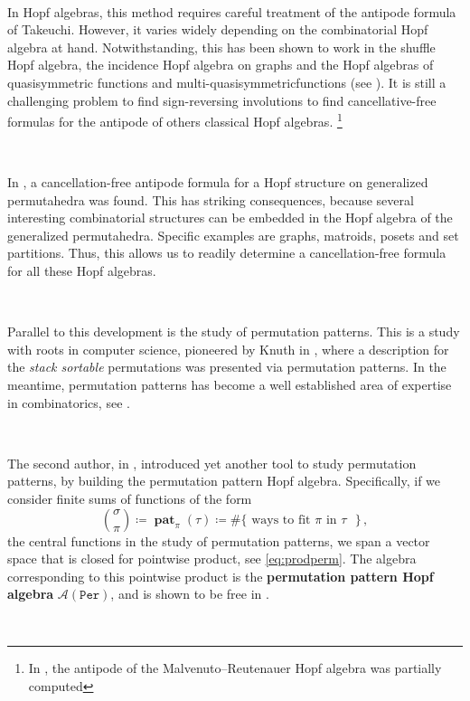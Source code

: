 \documentclass[12pt, reqno]{amsart}
\theoremstyle{definition}
\DeclareMathOperator{\pat}{\mathbf{pat}}
\begin{document}
\

In Hopf algebras, this method requires careful treatment of the antipode formula of Takeuchi.
However, it varies widely depending on the combinatorial Hopf algebra at hand.
Notwithstanding, this has been shown to work in the shuffle Hopf algebra, the incidence Hopf algebra on graphs and the Hopf algebras of quasisymmetric functions and multi-quasisymmetricfunctions (see \cite{BS2017}). It is still a challenging problem to find sign-reversing involutions to find cancellative-free formulas for the antipode of others classical Hopf algebras.  \footnote{In \cite{MalvenutoReutenauer}, the antipode of the Malvenuto–Reutenauer Hopf algebra was partially computed}


\

In \cite{aguiar2017hopf}, a cancellation-free antipode formula for a Hopf structure on generalized permutahedra was found. 
This has striking consequences, because several interesting combinatorial structures can be embedded in the Hopf algebra of the generalized permutahedra.
Specific examples are graphs, matroids, posets and set partitions.
Thus, this allows us to readily determine a cancellation-free formula for all these Hopf algebras.

\

Parallel to this development is the study of permutation patterns.
This is a study with roots in computer science, pioneered by Knuth in \cite{Knuth}, where a description for the \textit{stack sortable} permutations was presented via permutation patterns.
In the meantime, permutation patterns has become a well established area of expertise in combinatorics, see \cite{linton2010permutation}.

\

The second author, in \cite{Vargas}, introduced yet another tool to study permutation patterns, by building the permutation pattern Hopf algebra.
Specifically, if we consider finite sums of functions of the form 
$$ \binom{\sigma}{\pi} \coloneqq \pat_{\pi}(\tau)\coloneqq  \#\{\text{ ways to fit $\pi$ in $\tau$ }\}\, ,$$
the central functions in the study of permutation patterns, we span a vector space that is closed for pointwise product, see \eqref{eq:prodperm}.
The algebra corresponding to this pointwise product is the \textbf{permutation pattern Hopf algebra} $\mathcal{A}(\mathtt{Per})$, and is shown to be free in \cite{Vargas}.

\
\end{document}
